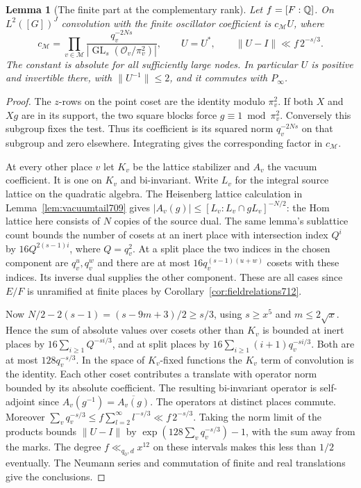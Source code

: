 \documentclass[a4paper,11pt]{article}
\newtheorem{lemma}[proposition]{Lemma}
\theoremstyle{definition}
\theoremstyle{remark}
\numberwithin{equation}{section}
\newcommand{\GL}{\operatorname{GL}}
\begin{document}
\begin{lemma}[The finite part at the complementary rank]
\leavevmode\label{lem:complementfinite812}
Let \(f=[F:\mathbb Q]\). On \(L^2([G])^J\) convolution with the
finite oscillator coefficient is \(c_{\mathcal M}U\), where
\[
 c_{\mathcal M}=\prod_{v\in\mathcal M}
       \frac{q_v^{-2Ns}}{|\GL_s(\mathcal O_v/\pi_v^2)|},
 \qquad
 U=U^*,\qquad \|U-I\|\ll f\,2^{-s/3}.
\]
The constant is absolute for all sufficiently large nodes.
In particular \(U\) is positive and invertible there, with
\(\|U^{-1}\|\le2\), and it commutes with \(P_\infty\).
\end{lemma}
\begin{proof}
The \(z\)-rows on the point coset are the identity modulo
\(\pi_v^2\). If both \(X\) and \(Xg\) are in its support,
the two square blocks force \(g\equiv1\bmod\pi_v^2\).
Conversely this subgroup fixes the test. Thus its coefficient
is its squared norm \(q_v^{-2Ns}\) on that subgroup and zero
elsewhere. Integrating gives the corresponding factor in
\(c_{\mathcal M}\).

At every other place \(v\) let \(K_v\) be the lattice
stabilizer and \(A_v\) the vacuum coefficient. It is one on
\(K_v\) and bi-invariant. Write \(L_v\) for the integral
source lattice on the quadratic algebra. The Heisenberg
lattice calculation in Lemma~\ref{lem:vacuumtail709} gives
\(|A_v(g)|\le[L_v:L_v\cap gL_v]^{-N/2}\): the Hom lattice
here consists of \(N\) copies of the source dual. The same
lemma's sublattice count bounds the number of cosets at an
inert place with intersection index \(Q^i\) by
\(16Q^{2(s-1)i}\), where \(Q=q_v^2\). At a split place
the two indices in the chosen component are \(q_v^u,q_v^w\)
and there are at most \(16q_v^{(s-1)(u+w)}\) cosets with
these indices. Its inverse dual supplies the other component.
These are all cases since \(E/F\) is unramified at finite
places by Corollary~\ref{cor:fieldrelations712}.

Now \(N/2-2(s-1)=(s-9m+3)/2\ge s/3\), using \(s\ge x^5\)
and \(m\le2\sqrt x\). Hence the sum of absolute values over
cosets other than \(K_v\) is bounded at inert places by
\(16\sum_{i\ge1}Q^{-si/3}\), and at split places by
\(16\sum_{i\ge1}(i+1)q_v^{-si/3}\).
Both are at most \(128q_v^{-s/3}\). In the space of
\(K_v\)-fixed functions the \(K_v\) term of convolution is
the identity. Each other coset contributes a translate
with operator norm bounded by its absolute coefficient.
The resulting bi-invariant operator is self-adjoint since
\(A_v(g^{-1})=\overline{A_v(g)}\). The operators at
distinct places commute. Moreover
\(\sum_v q_v^{-s/3}\le f\sum_{l=2}^\infty l^{-s/3}
\ll f\,2^{-s/3}\).
Taking the norm limit of the products bounds \(\|U-I\|\)
by \(\exp(128\sum_v q_v^{-s/3})-1\), with the sum away
from the marks. The degree \(f\ll_{q_0,d}x^{12}\) on
these intervals makes this less than \(1/2\) eventually.
The Neumann series and commutation of finite and real
translations give the conclusions.
\end{proof}
\end{document}
